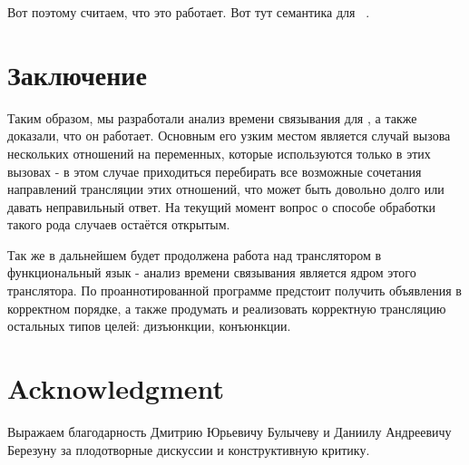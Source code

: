 \documentclass[conference]{IEEEtran}
\begin{document}
Вот поэтому считаем, что это работает. Вот тут семантика для \miniKanren~\cite{rozplokhas2019certified}.

\section{Заключение}\label{conclusion}

Таким образом, мы разработали анализ времени связывания для \miniKanren, а также доказали, что он работает. Основным его узким местом является случай вызова нескольких отношений на переменных, которые используются только в этих вызовах - в этом случае приходиться перебирать все возможные сочетания направлений трансляции этих отношений, что может быть довольно долго или давать неправильный ответ. На текущий момент вопрос о способе обработки такого рода случаев остаётся открытым.

Так же в дальнейшем будет продолжена работа над транслятором в функциональный язык - анализ времени связывания является ядром этого транслятора. По проаннотированной программе предстоит получить объявления в корректном порядке, а также продумать и реализовать корректную трансляцию остальных типов целей: дизъюнкции, конъюнкции.

\section*{Acknowledgment}

Выражаем благодарность Дмитрию Юрьевичу Булычеву и Даниилу Андреевичу Березуну за плодотворные дискуссии и конструктивную критику.



\end{document}
